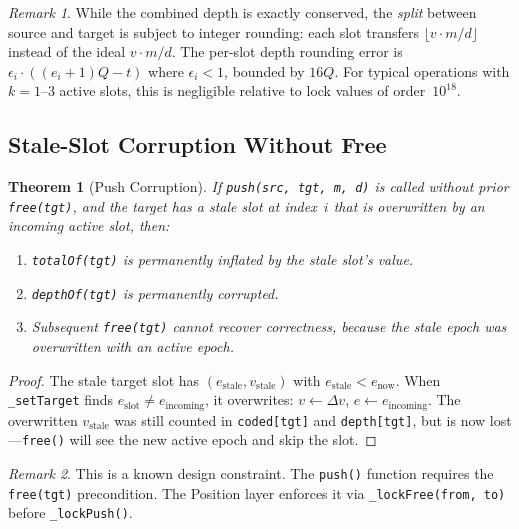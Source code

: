 \documentclass[10pt,a4paper,twocolumn]{article}
\theoremstyle{definition}
\theoremstyle{plain}
\newtheorem{theorem}{Theorem}[section]
\theoremstyle{remark}
\newtheorem{remark}{Remark}[section]
\begin{document}
\begin{remark}
While the combined depth is exactly conserved, the \emph{split} between source and target is subject to integer rounding: each slot transfers $\lfloor v \cdot m/d \rfloor$ instead of the ideal $v \cdot m/d$. The per-slot depth rounding error is $\epsilon_i \cdot ((e_i{+}1)Q - t)$ where $\epsilon_i < 1$, bounded by $16Q$. For typical operations with $k = 1$--$3$ active slots, this is negligible relative to lock values of order~$10^{18}$.
\end{remark}

\subsection{Stale-Slot Corruption Without Free}

\begin{theorem}[Push Corruption]
\label{thm:push-corruption}
If \texttt{push(src, tgt, m, d)} is called without prior \texttt{free(tgt)}, and the target has a stale slot at index~$i$ that is overwritten by an incoming active slot, then:
\begin{enumerate}[nosep]
\item \texttt{totalOf(tgt)} is permanently inflated by the stale slot's value.
\item \texttt{depthOf(tgt)} is permanently corrupted.
\item Subsequent \texttt{free(tgt)} cannot recover correctness, because the stale epoch was overwritten with an active epoch.
\end{enumerate}
\end{theorem}

\begin{proof}
The stale target slot has $(e_{\text{stale}}, v_{\text{stale}})$ with $e_{\text{stale}} < e_{\text{now}}$. When \texttt{\_setTarget} finds $e_{\text{slot}} \neq e_{\text{incoming}}$, it overwrites: $v \leftarrow \Delta v$, $e \leftarrow e_{\text{incoming}}$. The overwritten $v_{\text{stale}}$ was still counted in \texttt{coded[tgt]} and \texttt{depth[tgt]}, but is now lost---\texttt{free()} will see the new active epoch and skip the slot.
\end{proof}

\begin{remark}
This is a known design constraint. The \texttt{push()} function requires the \texttt{free(tgt)} precondition. The Position layer enforces it via \texttt{\_lockFree(from, to)} before \texttt{\_lockPush()}.
\end{remark}
\end{document}
